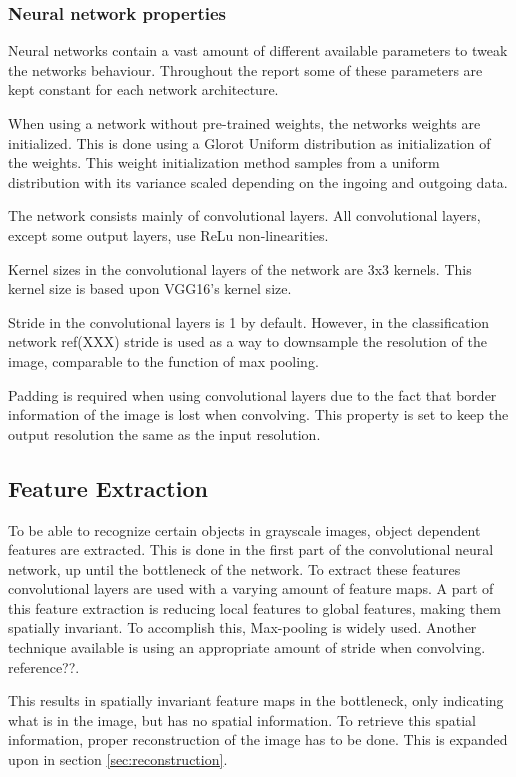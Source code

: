 \subsubsection{Neural network properties}
\label{sec:nnproperties}
Neural networks contain a vast amount of different available parameters to tweak the networks behaviour. Throughout the report some of these parameters are kept constant for each network architecture. 

When using a network without pre-trained weights, the networks weights are initialized. This is done using a Glorot Uniform distribution \cite{Glorot} as initialization of the weights. This weight initialization method samples from a uniform distribution with its variance scaled depending on the ingoing and outgoing data. %

The network consists mainly of convolutional layers. All convolutional layers, except some output layers, use ReLu non-linearities. 

Kernel sizes in the convolutional layers of the network are 3x3 kernels. This kernel size is based upon VGG16's \cite{Simonyan} kernel size.

Stride in the convolutional layers is 1 by default. However, in the classification network {\color{red} ref(XXX)} stride is used as a way to downsample the resolution of the image, comparable to the function of max pooling. %

Padding is required when using convolutional layers due to the fact that border information of the image is lost when convolving. This property is set to keep the output resolution the same as the input resolution. 


\subsection{Feature Extraction}
To be able to recognize certain objects in grayscale images, object dependent features are extracted. 
This is done in the first part of the convolutional neural network, up until the bottleneck of the network.
To extract these features convolutional layers are used with a varying amount of feature maps. A part of this feature extraction is reducing local features to global features, making them spatially invariant. To accomplish this, Max-pooling is widely used. Another technique available is using an appropriate amount of stride when convolving. {\color{red}reference??}.

This results in spatially invariant feature maps in the bottleneck, only indicating what is in the image, but has no spatial information. To retrieve this spatial information, proper reconstruction of the image has to be done. This is expanded upon in section \ref{sec:reconstruction}.

